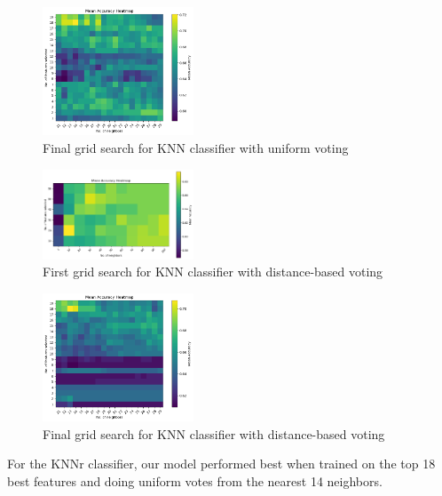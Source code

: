 \documentclass[journal,comsoc]{IEEEtran}
\begin{document}
\begin{figure}[H]
  \centering
  \includegraphics[width=0.4\textwidth]{knn3.png}
  \captionsetup{font=small} %
  \caption{Final grid search for KNN classifier with uniform voting}
  \label{fig:knn3}
\end{figure}


\begin{figure}[H]
  \centering
  \includegraphics[width=0.4\textwidth]{knn2.png}
  \captionsetup{font=small} %
  \caption{First grid search for KNN classifier with distance-based voting}
  \label{fig:knn2}
\end{figure}
\vspace{-20pt} 

\begin{figure}[H]
  \centering
  \includegraphics[width=0.4\textwidth]{knn4.png}
  \captionsetup{font=small} %
  \caption{Final grid search for KNN classifier with distance-based voting}
  \label{fig:knn4}
\end{figure}

For the KNNr classifier, our model performed best when trained on the top 18 best features and doing uniform votes from the nearest 14 neighbors.
\end{document}
